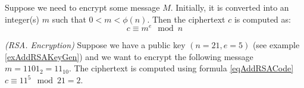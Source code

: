 Suppose we need to encrypt some message $M$. Initially, it is
converted into an integer(s) $m$ such that 
$0 < m < \phi\left(n\right)$. Then the ciphertext $c$ is computed as:
\begin{equation}
c \equiv m^e \mod{n}
\label{eqAddRSACode}
\end{equation}

\begin{example}
\emph{(RSA. Encryption)}
Suppose we have a public key $\left(n=21, e=5\right)$ (see example \ref{exAddRSAKeyGen}) 
and we want to encrypt the following message $m = 1101_2 = 11_{10}$. 
The ciphertext is computed using formula \eqref{eqAddRSACode} $c \equiv 11^5 \mod{21} = 2$.
\label{exAddRSACode}
\end{example}